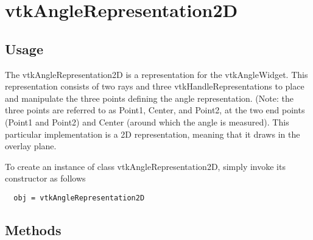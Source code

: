 \section{vtkAngleRepresentation2D}

\subsection{Usage}

 The vtkAngleRepresentation2D is a representation for the
 vtkAngleWidget. This representation consists of two rays and three
 vtkHandleRepresentations to place and manipulate the three points defining
 the angle representation. (Note: the three points are referred to as Point1,
 Center, and Point2, at the two end points (Point1 and Point2) and Center
 (around which the angle is measured). This particular implementation is a 
 2D representation, meaning that it draws in the overlay plane.

To create an instance of class vtkAngleRepresentation2D, simply
invoke its constructor as follows
\begin{verbatim}
  obj = vtkAngleRepresentation2D
\end{verbatim}
\subsection{Methods}

